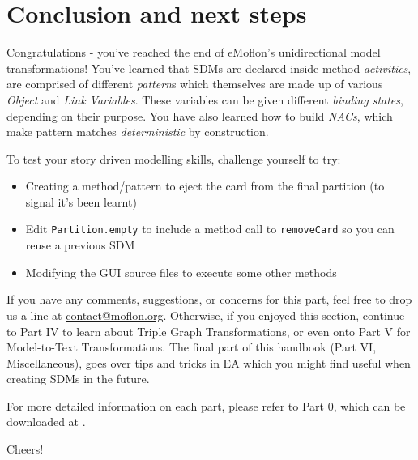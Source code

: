 \genHeader
\section{Conclusion and next steps}

\vspace{0.5cm}

Congratulations - you've reached the end of eMoflon's unidirectional model transformations! You've learned that SDMs are declared inside method
\emph{activities}, are comprised of different \emph{pattern}s which themselves are made up of various \emph{Object} and \emph{Link Variables}. These
variables can be given different \emph{binding states}, depending on their purpose. You have also learned how to build \emph{NACs}, which make pattern
matches \emph{deterministic} by construction.

\vspace{0.5cm}

To test your story driven modelling skills, challenge yourself to try:
\begin{itemize}
\item Creating a method/pattern to eject the card from the final partition (to signal it's been learnt)
\item Edit \texttt{Partition.empty} to include a method call to \texttt{removeCard} so you can reuse a previous SDM
\item Modifying the GUI source files to execute some other methods
\end{itemize}

\vspace{0.5cm}
	
If you have any comments, suggestions, or concerns for this part, feel free to drop us a line at \href{mailto:contact@moflon.org}{contact@moflon.org}.
Otherwise, if you enjoyed this section, continue to Part IV to learn about Triple Graph Transformations, or even onto Part V for Model-to-Text Transformations.
The final part of this handbook (Part VI, Miscellaneous), goes over tips and tricks in EA which you might find useful when creating SDMs in the future. 

For more detailed information on each part, please refer to Part 0, which can be downloaded at \dlPartZero.
\vspace{0.5cm}

Cheers!

